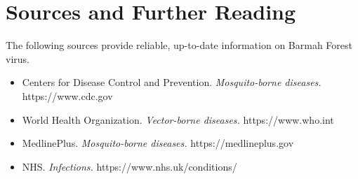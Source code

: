\section*{Sources and Further Reading}
The following sources provide reliable, up-to-date information on Barmah Forest virus.
\begin{itemize}
    \item Centers for Disease Control and Prevention. \textit{Mosquito-borne diseases.} https://www.cdc.gov
    \item World Health Organization. \textit{Vector-borne diseases.} https://www.who.int
    \item MedlinePlus. \textit{Mosquito-borne diseases.} https://medlineplus.gov
    \item NHS. \textit{Infections.} https://www.nhs.uk/conditions/
\end{itemize}
